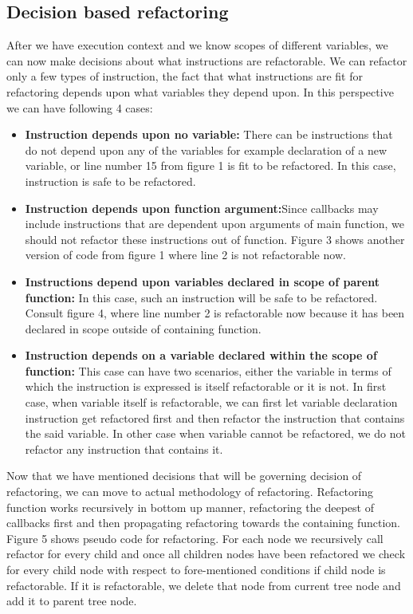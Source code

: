 \documentclass[10pt,conference]{IEEEtran}
\begin{document}
\subsection{Decision based refactoring}
After we have execution context and we know scopes of different variables, we can now make decisions about what instructions are refactorable. We can refactor only a few types of instruction, the fact that what instructions are fit for refactoring depends upon what variables they depend upon. In this perspective we can have following 4 cases:
\begin{itemize}
	\item {\textbf{Instruction depends upon no variable:}
		There can be instructions that do not depend upon any of the variables for example declaration of a new variable, or line number 15 from figure 1 is fit to be refactored. In this case, instruction is safe to be refactored.}
	\item{\textbf{Instruction depends upon function argument:}Since callbacks may include instructions that are dependent upon arguments of main function, we should not refactor these instructions out of function. Figure 3 shows another version of code from figure 1 where line 2 is not refactorable now.}
	\item{\textbf{Instructions depend upon variables declared in scope of parent function:}
		In this case, such an instruction will be safe to be refactored. Consult figure 4, where line number 2 is refactorable now because it has been declared in scope outside of containing function.}
	\item{\textbf{Instruction depends on a variable declared within the scope of function:}
		This case can have two scenarios, either the variable in terms of which the instruction is expressed is itself refactorable or it is not. In first case, when variable itself is refactorable, we can first let variable declaration instruction get refactored first and then refactor the instruction that contains the said variable.
		In other case when variable cannot be refactored, we do not refactor any instruction that contains it.}
\end{itemize}
Now that we have mentioned decisions that will be governing decision of refactoring, we can move to actual methodology of refactoring. Refactoring function works recursively in bottom up manner, refactoring the deepest of callbacks first and then propagating refactoring towards the containing function. Figure 5 shows pseudo code for refactoring. For each node we recursively call refactor for every child and once all children nodes have been refactored we check for every child node with respect to fore-mentioned conditions if child node is refactorable. If it is refactorable, we delete that node from current tree node and add it to parent tree node.
\end{document}
